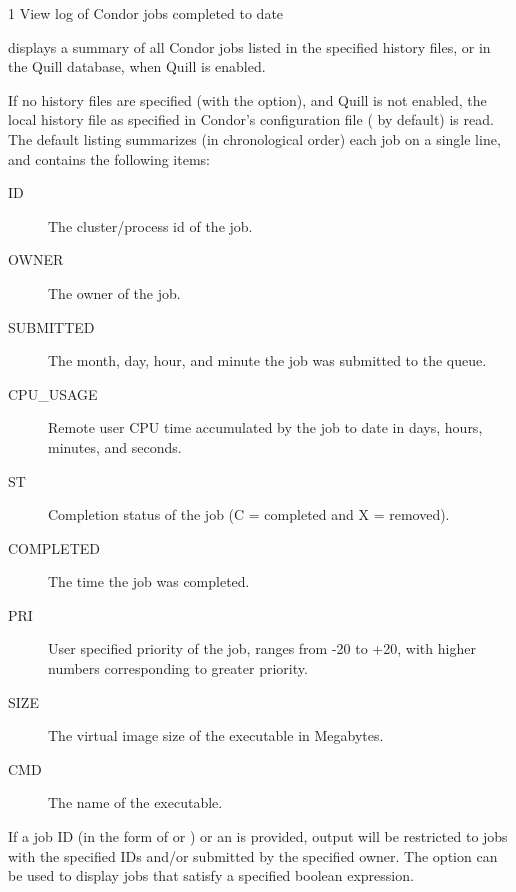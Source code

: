 \begin{ManPage}{\label{man-condor-history}}{1}
{View log of Condor jobs completed to date}
\Synopsis
{}


\Description
{} displays a summary of all Condor jobs listed in the
specified history files, or in the Quill database, when Quill is enabled.

If no history files are specified (with the  option), and Quill
is not enabled, the local history file as specified in Condor's 
configuration file ( by default) is read.  
The default listing summarizes (in chronological order)
each job on a single line, and  contains the following items:


\begin{description}
\item[ID] The cluster/process id of the job. 
\item[OWNER] The owner of the job. 
\item[SUBMITTED] The month, day, hour, and minute the job was submitted to the queue. 
\item[CPU\_USAGE] Remote user CPU time accumulated by the job to date in days, hours, minutes, and seconds.
\item[ST] Completion status of the job (C = completed and X = removed).
\item[COMPLETED] The time the job was completed.
\item[PRI] User specified priority of the job, ranges from -20 to +20, with higher numbers corresponding to greater priority. 
\item[SIZE] The virtual image size of the executable in Megabytes. 
\item[CMD] The name of the executable. 
\end{description}

If a job ID (in the form of  or ) or an
 is provided, output will be restricted to jobs with the
specified IDs and/or submitted by the specified owner.  
The  option can be used to display jobs that satisfy a
specified boolean expression.


\end{ManPage}
